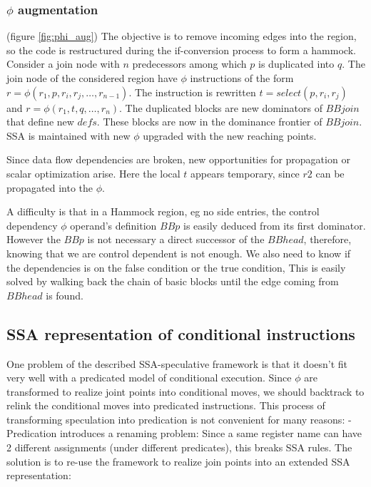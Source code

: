 \subsubsection{$\phi$ augmentation} (figure \ref{fig:phi_aug})
The objective is to remove incoming edges into the region, so the code is restructured during the if-conversion process to form a hammock. Consider a join node with $n$ predecessors among which $p$ is duplicated into $q$.  The join node of the considered region have $\phi$ instructions of the form $r=\phi(r_1,p,r_i,r_j,\dots,r_{n-1})$. The instruction is rewritten $t=select(p,r_i,r_j)$ and \mbox{$r=\phi(r_1,t,q,\dots,r_n)$}. 
The duplicated blocks are new dominators of $BBjoin$ that define new $defs$. These blocks are now in the dominance frontier of $BBjoin$. SSA is maintained with new $\phi$ upgraded with the new reaching points.

Since data flow dependencies are broken, new opportunities for propagation or scalar optimization arise. Here the local $t$ appears temporary, since $r2$ can be propagated into the $\phi$.

A difficulty is that in a Hammock region, eg no side entries, the control dependency $\phi$ operand's definition $BBp$ is easily deduced from its first dominator. However the $BBp$ is not necessary a direct successor of the $BBhead$, therefore, knowing that we are control dependent is not enough. We also need to know if the dependencies is on the false condition or the true condition, This is easily solved by walking back the chain of basic blocks until the edge coming from $BBhead$ is found.

\subsection{SSA representation of conditional instructions}

One problem of the described SSA-speculative framework is that it doesn't fit very well with a predicated model of conditional execution. Since $\phi$ are transformed to realize joint points into conditional moves, we should backtrack to relink the conditional moves into predicated instructions. This process of transforming speculation into predication is not convenient for many reasons:
- Predication introduces a renaming problem: Since a same register name can have 2 different assignments (under different predicates), this breaks SSA rules. The solution is to re-use the framework to realize join points into an extended SSA representation:

